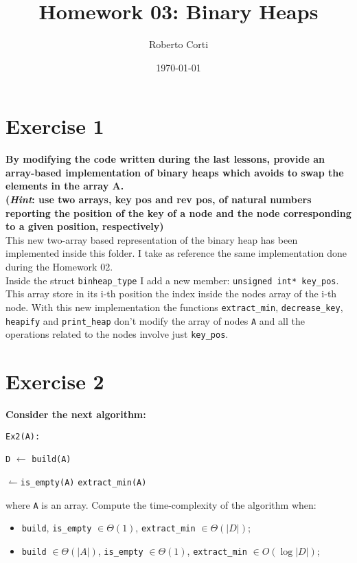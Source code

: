 \documentclass{article}
\title{Homework 03: Binary Heaps}
\date{\today}
\author{Roberto Corti}
\begin{document}
	\maketitle
	\section*{Exercise 1}
	\textbf{By modifying the code written during the last lessons, provide an array-based implementation of binary heaps which avoids to swap the elements in the array A. \\
	(\textit{Hint}: use two arrays, key pos and rev pos, of natural numbers reporting the position of the key of a node and the node corresponding to a given position, respectively)} \\
	
	\noindent This new two-array based representation of the binary heap has been implemented inside this folder. I take as reference the same implementation done during the Homework 02. \\
	Inside the struct \texttt{binheap\_type} I add a new member: \texttt{unsigned int* key\_pos}. This array store in its i-th position the index inside the nodes array of the i-th node. With this new implementation the functions \texttt{extract\_min}, \texttt{decrease\_key}, \texttt{heapify} and \texttt{print\_heap} don't modify the array of nodes \texttt{A} and all the operations related to the nodes involve just \texttt{key\_pos}.
	\section*{Exercise 2}
	\textbf{Consider the next algorithm:}
	
	\begin{algorithm}
	\texttt{Ex2(A):} \label{ex2}
	\begin{algorithmic}
		\State \texttt{D} $\gets$ \texttt{build(A)}
		
		\While $\leftharpoonup$\texttt{is\_empty(A)}
			\State \texttt{extract\_min(A)}
		\EndWhile
	
	\end{algorithmic}
\end{algorithm}

	where \texttt{A} is an array. Compute the time-complexity of the algorithm when:
	
	\begin{itemize}
		\item \texttt{build}, \texttt{is\_empty} $\in \Theta(1)$, \texttt{extract\_min} $\in \Theta(|D|)$;
		\item \texttt{build} $\in \Theta(|A|)$, \texttt{is\_empty} $\in \Theta(1)$, \texttt{extract\_min} $\in O(\log|D|)$;
	\end{itemize}
\end{document}

